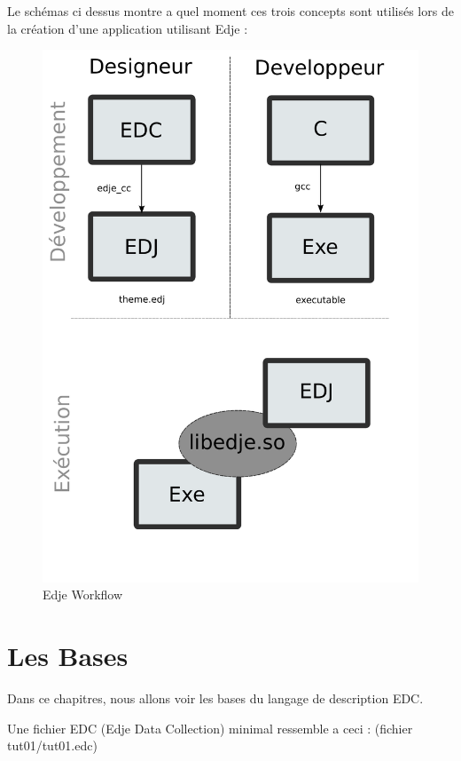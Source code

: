 \documentclass[a4paper]{efr}
\begin{document}
Le schémas ci dessus montre a quel moment ces trois concepts sont utilisés lors
de la création d'une application utilisant Edje :

\begin{figure}
  \begin{center}
    \includegraphics[scale=0.7]{images/workflow.pdf}
  \end{center}
  \caption{Edje Workflow}
\end{figure}

\section{Les Bases}

Dans ce chapitres, nous allons voir les bases du langage de description EDC.

Une fichier EDC (Edje Data Collection) minimal ressemble a ceci : (fichier
tut01/tut01.edc)
\end{document}

